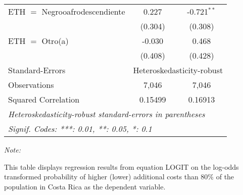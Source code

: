 \begin{table}[htbp!]
\begin{adjustbox}{width = 1\textwidth, max height = 0.95\textheight, center}
\begin{threeparttable}[b]
\begin{tabular}{lcc}
            ETH $=$ Negrooafrodescendiente & 0.227          & -0.721$^{**}$\\   
                                           & (0.304)        & (0.308)\\   
            ETH $=$ Otro(a)                & -0.030         & 0.468\\   
                                           & (0.408)        & (0.428)\\   
            \midrule 
            Standard-Errors & \multicolumn{2}{c}{Heteroskedasticity-robust} \\ 
            Observations                   & 7,046          & 7,046\\  
            Squared Correlation            & 0.15499        & 0.16913\\  
            \midrule \midrule
            \multicolumn{3}{l}{\emph{Heteroskedasticity-robust standard-errors in parentheses}}\\
            \multicolumn{3}{l}{\emph{Signif. Codes: ***: 0.01, **: 0.05, *: 0.1}}\\
         \end{tabular}
         
         \begin{tablenotes}\item \medskip \textit{Note:}
            \item This table displays regression results from equation LOGIT on the log-odds transformed probability of higher (lower) additional costs than 80\% of the population in Costa Rica as the dependent variable. 
         \end{tablenotes}
      \end{threeparttable}
   \end{adjustbox}
\end{table}


